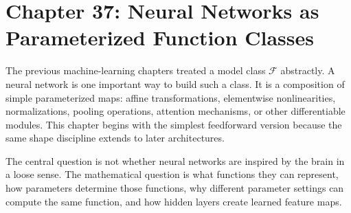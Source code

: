 \section{Chapter 37: Neural Networks as Parameterized Function Classes}
\label{ch:neural-networks-parameterized-function-classes}

The previous machine-learning chapters treated a model class \(\mathcal F\) abstractly. A neural network is one important way to build such a class. It is a composition of simple parameterized maps: affine transformations, elementwise nonlinearities, normalizations, pooling operations, attention mechanisms, or other differentiable modules. This chapter begins with the simplest feedforward version because the same shape discipline extends to later architectures.

The central question is not whether neural networks are inspired by the brain in a loose sense. The mathematical question is what functions they can represent, how parameters determine those functions, why different parameter settings can compute the same function, and how hidden layers create learned feature maps.

